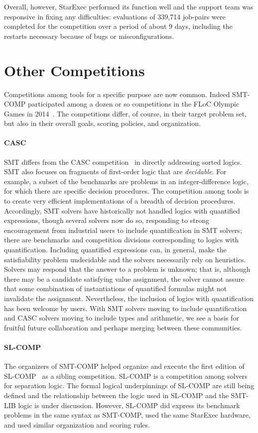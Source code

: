 \documentclass[twoside,11pt]{article}
\begin{document}
Overall, however, StarExec performed its function well and the support team was responsive in fixing any difficulties: evaluations of 339,714 job-pairs were completed for the competition over a period of about 9 days, including the restarts necessary because of bugs or misconfigurations.

\section{Other Competitions}
\label{sec:OtherCompetitions}

Competitions among tools for a specific purpose are now common. Indeed SMT-COMP participated among a dozen or so competitions in the FLoC Olympic Games in 2014~\cite{FLoC2014}.  The competitions differ, of course, in their target problem set, but also in their overall goals, scoring policies, and organization.
 
\paragraph{CASC} SMT differs from the CASC competition~\cite{PSS02} in directly addressing sorted logics. SMT also focuses on fragments of first-order logic that are \emph{decidable}. For example, a subset of the benchmarks are problems in an integer-difference logic, for which there are specific decision procedures. The competition among tools is to create very efficient implementations of a breadth of decision procedures. Accordingly, SMT solvers have historically not handled logics with quantified expressions, though several solvers now do so, responding to strong encouragement from industrial users to include quantification in SMT solvers; there are benchmarks and competition divisions corresponding to logics with quantification. Including quantified expressions can, in general, make the satisfiability problem undecidable and the solvers necessarily rely on heuristics. Solvers may respond that the answer to a problem is unknown; that is, although there may be a candidate satisfying value assignment, the solver cannot assure that some combination of instantiations of quantified formulas might not invalidate the assignment.
Nevertheless, the inclusion of logics with quantification has been welcome by users. With SMT solvers moving to include quantification and CASC solvers moving to include types and arithmetic, we see a basis for fruitful future collaboration and perhaps merging between these communities.

\paragraph{SL-COMP} The organizers of SMT-COMP helped organize and execute the first edition of SL-COMP~\cite{SLCOMP,sighireanu2014report} as a sibling competition. SL-COMP is a competition among solvers for separation logic. The formal logical underpinnings of SL-COMP are still being defined and the relationship between the logic used in SL-COMP and the SMT-LIB logic is under discussion. However, SL-COMP did express its benchmark problems in the same syntax as SMT-COMP, used the same StarExec hardware, and used similar organization and scoring rules.
\end{document}
